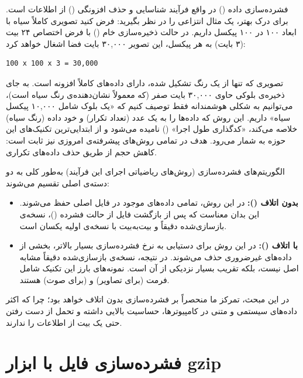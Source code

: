 فشرده‌سازی داده () در واقع فرآیند شناسایی و حذف افزونگی () از اطلاعات است. برای درک بهتر، یک مثال انتزاعی را در نظر بگیرید: فرض کنید تصویری کاملاً سیاه با ابعاد ۱۰۰ در ۱۰۰ پیکسل داریم. در حالت ذخیره‌سازی خام () با فرض اختصاص ۲۴ بیت (۳ بایت) به هر پیکسل، این تصویر ۳۰,۰۰۰ بایت فضا اشغال خواهد کرد:

\begin{latin}
\begin{lstlisting}
100 x 100 x 3 = 30,000
\end{lstlisting}
\end{latin}

تصویری که تنها از یک رنگ تشکیل شده، دارای داده‌های کاملاً افزونه است. به جای ذخیره‌ی بلوکی حاوی ۳۰,۰۰۰ بایت صفر (که معمولاً نشان‌دهنده‌ی رنگ سیاه است)، می‌توانیم به شکلی هوشمندانه فقط توصیف کنیم که «یک بلوک شامل ۱۰,۰۰۰ پیکسل سیاه» داریم. این روش که داده‌ها را به یک عدد (تعداد تکرار) و خود داده (رنگ سیاه) خلاصه می‌کند، «کدگذاری طول اجرا» () نامیده می‌شود و از ابتدایی‌ترین تکنیک‌های این حوزه به شمار می‌رود. هدف در تمامی روش‌های پیشرفته‌ی امروزی نیز ثابت است: کاهش حجم از طریق حذف داده‌های تکراری.

الگوریتم‌های فشرده‌سازی (روش‌های ریاضیاتی اجرای این فرآیند) به‌طور کلی به دو دسته‌ی اصلی تقسیم می‌شوند:

\begin{itemize}
  \item \textbf{بدون اتلاف ():} در این روش، تمامی داده‌های موجود در فایل اصلی حفظ می‌شوند. این بدان معناست که پس از بازگشت فایل از حالت فشرده ()، نسخه‌ی بازسازی‌شده دقیقاً و بیت‌به‌بیت با نسخه‌ی اولیه یکسان است.

  \item \textbf{با اتلاف ():} در این روش برای دستیابی به نرخ فشرده‌سازی بسیار بالاتر، بخشی از داده‌های غیرضروری حذف می‌شوند. در نتیجه، نسخه‌ی بازسازی‌شده دقیقاً مشابه اصل نیست، بلکه تقریب بسیار نزدیکی از آن است. نمونه‌های بارز این تکنیک شامل فرمت  (برای تصاویر) و  (برای صوت) هستند.
\end{itemize}

در این مبحث، تمرکز ما منحصراً بر فشرده‌سازی بدون اتلاف خواهد بود؛ چرا که اکثر داده‌های سیستمی و متنی در کامپیوترها، حساسیت بالایی داشته و تحمل از دست رفتن حتی یک بیت از اطلاعات را ندارند.

\section{فشرده‌سازی فایل با ابزار gzip}

